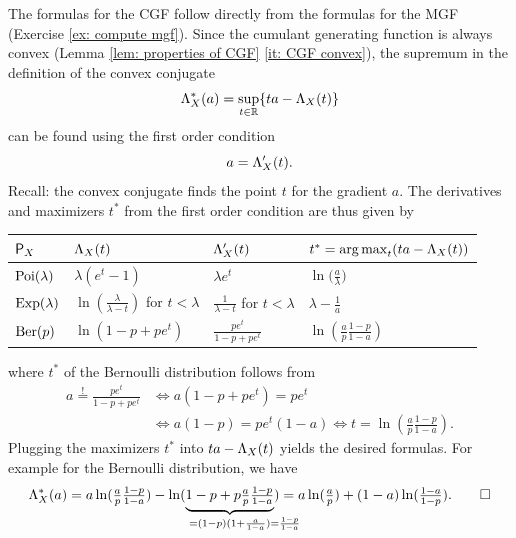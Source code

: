 \begin{solution}
    The formulas for the CGF follow directly from the formulas for the MGF (Exercise \ref{ex: compute mgf}).
    Since the cumulant generating function is always convex (Lemma \ref{lem: properties of CGF} \ref{it: CGF convex}),
    the supremum in the definition of the convex conjugate
    \[
        \Lambda_X^*(a) = \sup_{t \in \mathbb{R}} \{t a - \Lambda_X(t)\}
    \]
    can be found using the first order condition
    \[
        a = \Lambda_X'(t).
    \]
    Recall: the convex conjugate finds the point \(t\) for the gradient \(a\).
    The derivatives and maximizers \(t^*\) from the first order condition are thus given by
    \begin{center}
    \def\arraystretch{1.2}
    \begin{tabular}{l l l l}
        \toprule
        \(\mathsf{P}_X\)
        & \(\Lambda_X(t)\)
        & \(\Lambda_X'(t)\)
        & \(t^*=\operatorname*{arg\,max}_t (ta - \Lambda_X(t))\)
        \\
        \midrule
        \(\mathrm{Poi}(\lambda)\)
        & \(\lambda (e^{t} - 1)\)
        & \(\lambda e^t\)
        & \(\ln\bigl(\frac{a}{\lambda}\bigr)\)
        \\
        \(\mathrm{Exp}(\lambda)\)
        & \(\ln(\frac{\lambda}{\lambda - t})\) for \(t < \lambda\)
        & \(\frac1{\lambda-t}\) for \(t<\lambda\)
        & \(\lambda - \frac1a\)
        \\
        \(\mathrm{Ber}(p)\)
        & \(\ln(1 - p + p e^{t})\)
        & \(\frac{pe^t}{1-p+p e^t}\)
        & \(\ln(\frac{a}p\frac{1-p}{1-a})\)
        \\
        \bottomrule
    \end{tabular}
    \end{center}
    where \(t^*\) of the Bernoulli distribution follows from
    \begin{align*}
        a \overset{!}= \frac{pe^t}{1-p+p e^t}
        &\iff a(1-p+p e^t) = pe^t
        \\
        &\iff a(1-p) = pe^t(1 - a)
        \iff t = \ln(\tfrac{a}p\tfrac{1-p}{1-a}).
    \end{align*}
    Plugging the maximizers \(t^*\) into \(ta - \Lambda_X(t)\) yields the desired formulas.
    For example for the Bernoulli distribution, we have
    \[
        \CGF_X^*(a) = a \ln(\tfrac{a}p\tfrac{1-p}{1-a}) - \ln(\underbrace{1 - p + p \tfrac{a}p\tfrac{1-p}{1-a}}_{= (1-p)(1+\frac{a}{1-a})\mathrlap{=\frac{1-p}{1-a}}})
        = a\ln(\tfrac{a}p) + (1-a)\ln(\tfrac{1-a}{1-p}).
        \qedhere
    \]
\end{solution}
